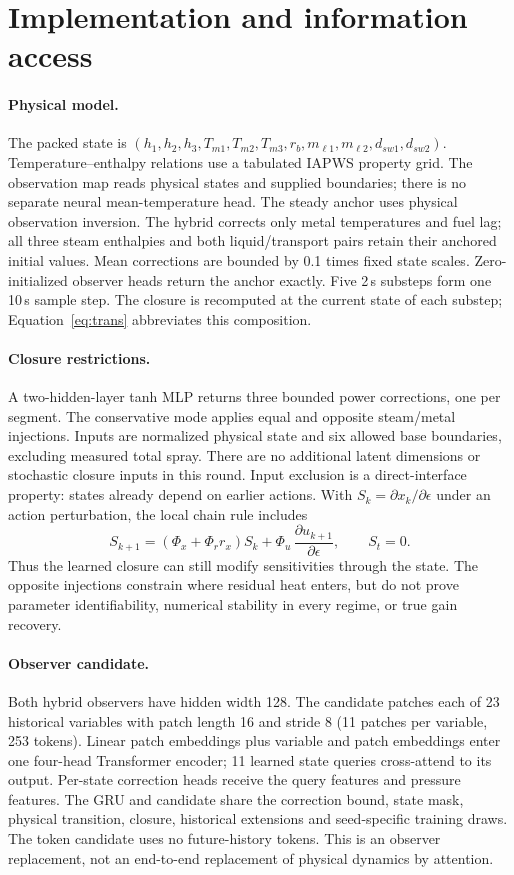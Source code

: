 \section{Implementation and information access}\label{app:implementation}

\paragraph{Physical model.}
The packed state is $(h_1,h_2,h_3,T_{m1},T_{m2},T_{m3},r_b,m_{\ell1},m_{\ell2},
d_{sw1},d_{sw2})$. Temperature--enthalpy relations use a tabulated IAPWS
property grid. The observation map reads physical states and supplied boundaries;
there is no separate neural mean-temperature head. The steady anchor uses
physical observation inversion. The hybrid corrects only metal temperatures
and fuel lag; all three steam enthalpies and both liquid/transport pairs retain
their anchored initial values. Mean corrections are bounded by 0.1 times fixed
state scales. Zero-initialized observer heads return the anchor exactly.
Five 2\,s substeps form one 10\,s sample step. The closure is recomputed at the
current state of each substep; Equation~\ref{eq:trans} abbreviates this composition.

\paragraph{Closure restrictions.}
A two-hidden-layer tanh MLP returns three bounded power corrections, one per
segment. The conservative mode applies equal and opposite steam/metal injections.
Inputs are normalized physical state and six allowed base boundaries, excluding
measured total spray. There are no additional latent dimensions or stochastic
closure inputs in this round. Input exclusion is a direct-interface property:
states already depend on earlier actions. With $S_k=\partial x_k/\partial\epsilon$
under an action perturbation, the local chain rule includes
\[
S_{k+1}=(\Phi_x+\Phi_r r_x)S_k+\Phi_u\,
\frac{\partial u_{k+1}}{\partial\epsilon},\qquad S_t=0.
\]
Thus the learned closure can still modify sensitivities through the state.
The opposite injections constrain where residual heat enters, but do not prove
parameter identifiability, numerical stability in every regime, or true gain recovery.

\paragraph{Observer candidate.}
Both hybrid observers have hidden width 128. The candidate patches each of 23
historical variables with patch length 16 and stride 8 (11 patches per variable,
253 tokens). Linear patch embeddings plus variable and patch embeddings enter
one four-head Transformer encoder; 11 learned state queries cross-attend to
its output. Per-state correction heads receive the query features and pressure
features. The GRU and candidate share the correction bound, state mask,
physical transition, closure, historical extensions and seed-specific training
draws. The token candidate uses no future-history tokens. This is an observer
replacement, not an end-to-end replacement of physical dynamics by attention.

